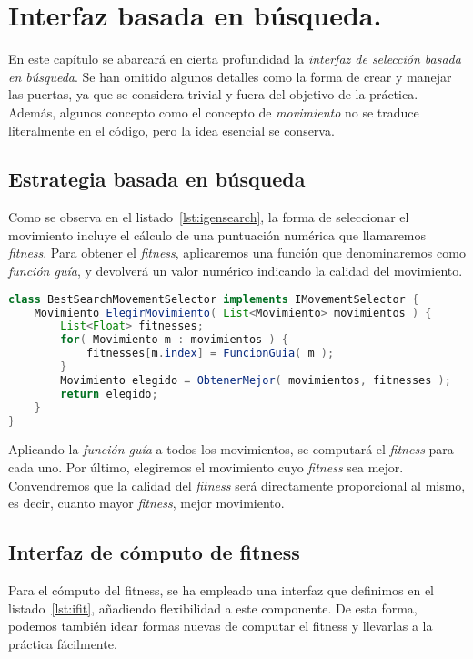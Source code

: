 \chapter{Interfaz basada en búsqueda.}\label{cap:capitulo5}

En este capítulo se abarcará en cierta profundidad la \emph{interfaz de selección basada en búsqueda}. Se han omitido algunos detalles como la forma de crear y manejar las puertas, ya que se considera trivial y fuera del objetivo de la práctica. Además, algunos concepto como el concepto de \emph{movimiento} no se traduce literalmente en el código, pero la idea esencial se conserva.

\section{Estrategia basada en búsqueda}

Como se observa en el listado~\ref{lst:igensearch}, la forma de seleccionar el movimiento incluye el cálculo de una puntuación numérica que llamaremos \emph{fitness}. Para obtener el \emph{fitness}, aplicaremos una función que denominaremos como \emph{función guía}, y devolverá un valor numérico indicando la calidad del movimiento.

\begin{lstlisting}[caption={Interfaz de selección de movimiento basada en búsqueda},label={lst:igensearch},language=Java,escapechar=|]
class BestSearchMovementSelector implements IMovementSelector {
	Movimiento ElegirMovimiento( List<Movimiento> movimientos ) {
		List<Float> fitnesses;
		for( Movimiento m : movimientos ) {
			fitnesses[m.index] = FuncionGuia( m );
		}
		Movimiento elegido = ObtenerMejor( movimientos, fitnesses );
		return elegido;
	}
}
\end{lstlisting}

Aplicando la \emph{función guía} a todos los movimientos, se computará el \emph{fitness} para cada uno. Por último, elegiremos el movimiento cuyo \emph{fitness} sea mejor. Convendremos que la calidad del \emph{fitness} será directamente proporcional al mismo, es decir, cuanto mayor \emph{fitness}, mejor movimiento.

\section{Interfaz de cómputo de fitness}

Para el cómputo del fitness, se ha empleado una interfaz que definimos en el listado~\ref{lst:ifit}, añadiendo flexibilidad a este componente. De esta forma, podemos también idear formas nuevas de computar el fitness y llevarlas a la práctica fácilmente.


